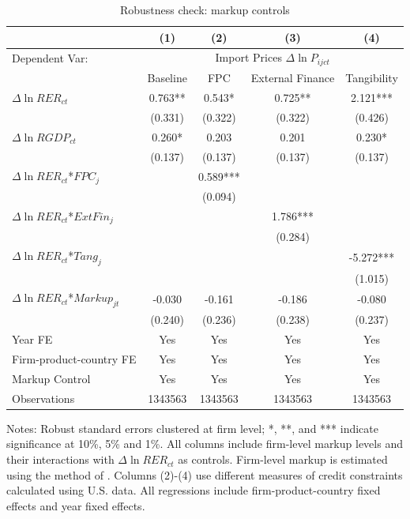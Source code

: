 \begin{table}[H]
	\centering
	\caption{Robustness check: markup controls}
	\begin{threeparttable}
		\begin{tabular}{lcccc}
			\toprule         
			& (1)   & (2)   & (3)   & (4)     \\
			\midrule
                Dependent Var: & \multicolumn{4}{c}{ Import Prices $\Delta \ln P_{ijct}$} \\
			& Baseline & FPC & External Finance & Tangibility\\
			\midrule
			$\Delta \ln RER_{ct}$ & 0.763** & 0.543* & 0.725** & 2.121*** \\
			& (0.331) & (0.322) & (0.322) & (0.426) \\
			$\Delta \ln RGDP_{ct}$ & 0.260*	& 0.203 & 0.201 & 0.230*\\
			& (0.137) & (0.137) & (0.137) & (0.137)  \\
			$\Delta \ln RER_{ct}$*$FPC_{j}$ &   & 0.589*** &       &  \\
			&   & (0.094) &       &  \\
			$\Delta \ln RER_{ct}$*$ExtFin_{j}$ &     &       & 1.786*** &  \\
			&   &       & (0.284) &  \\
			$\Delta \ln RER_{ct}$*$Tang_{j}$  &     &       &       & -5.272*** \\
			&    &       &       & (1.015) \\
                $\Delta \ln RER_{ct}$*$Markup_{jt}$ &  -0.030 & -0.161 & -0.186 & -0.080 \\
			&   (0.240) & (0.236) & (0.238) & (0.237) \\
                \midrule
			Year FE  & Yes   & Yes   & Yes   & Yes       \\
			Firm-product-country FE & Yes   & Yes   & Yes   & Yes       \\
			Markup Control & Yes   & Yes   & Yes   & Yes       \\
			Observations & 1343563 & 1343563 & 1343563 & 1343563  \\
			\bottomrule
		\end{tabular}
		\begin{tablenotes}
			\footnotesize
			\item Notes: Robust standard errors clustered at firm level; *, **, and *** indicate significance at 10\%, 5\% and 1\%. All columns include firm-level markup levels and their interactions with $\Delta \ln RER_{ct}$ as controls. Firm-level markup is estimated using the method of \cite{dlw2012}. Columns (2)-(4) use different measures of credit constraints calculated using U.S. data. All regressions include firm-product-country fixed effects and year fixed effects.
		\end{tablenotes}
	\end{threeparttable}
        \label{tab.markup}
\end{table}

